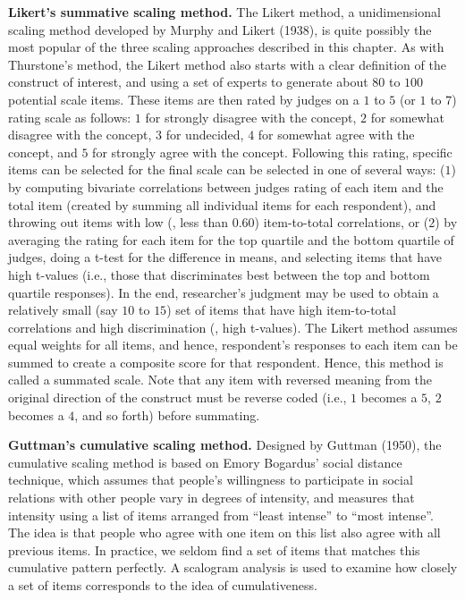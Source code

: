 \textbf{Likert's summative scaling method.} The Likert method, a unidimensional scaling method developed by Murphy and Likert (1938), is quite possibly the most popular of the three scaling approaches described in this chapter. As with Thurstone's method, the Likert method also starts with a clear definition of the construct of interest, and using a set of experts to generate about $ 80 $ to $ 100 $ potential scale items. These items are then rated by judges on a $ 1 $ to $ 5 $ (or $ 1 $ to $ 7 $) rating scale as follows: $ 1 $ for strongly disagree with the concept, $ 2 $ for somewhat disagree with the concept, $ 3 $ for undecided, $ 4 $ for somewhat agree with the concept, and $ 5 $ for strongly agree with the concept. Following this rating, specific items can be selected for the final scale can be selected in one of several ways: ($ 1 $) by computing bivariate correlations between judges rating of each item and the total item (created by summing all individual items for each respondent), and throwing out items with low (\eg, less than $ 0.60 $) item-to-total correlations, or ($ 2 $) by averaging the rating for each item for the top quartile and the bottom quartile of judges, doing a t-test for the difference in means, and selecting items that have high t-values (i.e., those that discriminates best between the top and bottom quartile responses). In the end, researcher's judgment may be used to obtain a relatively small (say $ 10 $ to $ 15 $) set of items that have high item-to-total correlations and high discrimination (\ie, high t-values). The Likert method assumes equal weights for all items, and hence, respondent's responses to each item can be summed to create a composite score for that respondent. Hence, this method is called a summated scale. Note that any item with reversed meaning from the original direction of the construct must be reverse coded (i.e., $ 1 $ becomes a $ 5 $, $ 2 $ becomes a $ 4 $, and so forth) before summating.

\textbf{Guttman's cumulative scaling method.} Designed by Guttman (1950), the cumulative scaling method is based on Emory Bogardus' social distance technique, which assumes that people's willingness to participate in social relations with other people vary in degrees of intensity, and measures that intensity using a list of items arranged from ``least intense'' to ``most intense''. The idea is that people who agree with one item on this list also agree with all previous items. In practice, we seldom find a set of items that matches this cumulative pattern perfectly. A scalogram analysis is used to examine how closely a set of items corresponds to the idea of cumulativeness.

